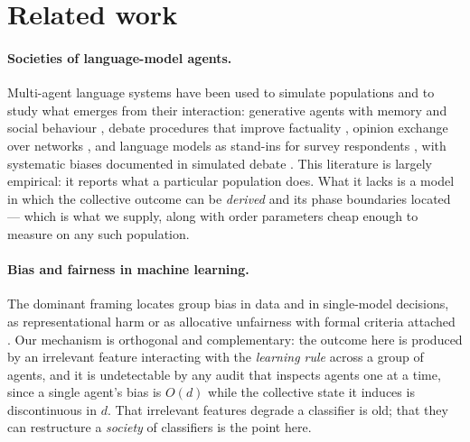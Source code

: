 \section{Related work}
\label{sec:related}

\paragraph{Societies of language-model agents.} Multi-agent language systems have
been used to simulate populations and to study what emerges from their
interaction: generative agents with memory and social behaviour
\citep{park2022social,park2023generative}, debate procedures that improve
factuality \citep{du2023debate}, opinion exchange over networks
\citep{chuang2024simulating}, and language models as stand-ins for survey
respondents \citep{argyle2023out,aher2023using}, with systematic biases documented
in simulated debate \citep{taubenfeld2024systematic}. This literature is largely
empirical: it reports what a particular population does. What it lacks is a model
in which the collective outcome can be \emph{derived} and its phase boundaries
located --- which is what we supply, along with order parameters cheap enough to
measure on any such population.

\paragraph{Bias and fairness in machine learning.} The dominant framing locates
group bias in data and in single-model decisions, as representational harm
\citep{blodgett2020language,bender2021dangers} or as allocative unfairness with
formal criteria attached
\citep{dwork2012fairness,hardt2016equality,barocas2023fairness}. Our mechanism is
orthogonal and complementary: the outcome here is produced by an irrelevant
feature interacting with the \emph{learning rule} across a group of agents, and it
is undetectable by any audit that inspects agents one at a time, since a single
agent's bias is $O(d)$ while the collective state it induces is discontinuous in
$d$. That irrelevant features degrade a classifier is old; that they can
restructure a \emph{society} of classifiers is the point here.

